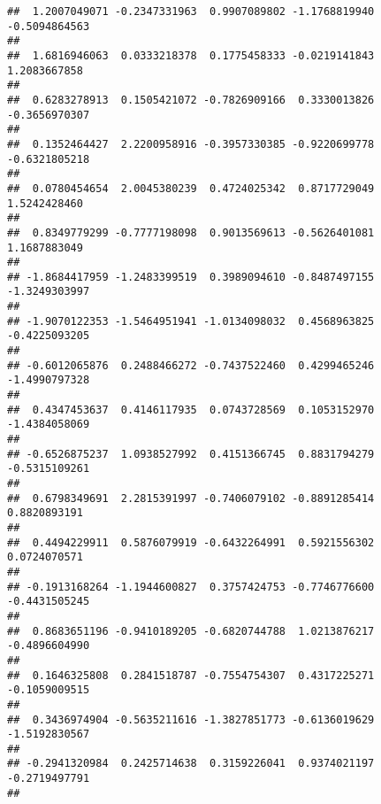 \documentclass[]{article}
\begin{document}
\begin{verbatim}
##  1.2007049071 -0.2347331963  0.9907089802 -1.1768819940 -0.5094864563 
##                                                                       
##  1.6816946063  0.0333218378  0.1775458333 -0.0219141843  1.2083667858 
##                                                                       
##  0.6283278913  0.1505421072 -0.7826909166  0.3330013826 -0.3656970307 
##                                                                       
##  0.1352464427  2.2200958916 -0.3957330385 -0.9220699778 -0.6321805218 
##                                                                       
##  0.0780454654  2.0045380239  0.4724025342  0.8717729049  1.5242428460 
##                                                                       
##  0.8349779299 -0.7777198098  0.9013569613 -0.5626401081  1.1687883049 
##                                                                       
## -1.8684417959 -1.2483399519  0.3989094610 -0.8487497155 -1.3249303997 
##                                                                       
## -1.9070122353 -1.5464951941 -1.0134098032  0.4568963825 -0.4225093205 
##                                                                       
## -0.6012065876  0.2488466272 -0.7437522460  0.4299465246 -1.4990797328 
##                                                                       
##  0.4347453637  0.4146117935  0.0743728569  0.1053152970 -1.4384058069 
##                                                                       
## -0.6526875237  1.0938527992  0.4151366745  0.8831794279 -0.5315109261 
##                                                                       
##  0.6798349691  2.2815391997 -0.7406079102 -0.8891285414  0.8820893191 
##                                                                       
##  0.4494229911  0.5876079919 -0.6432264991  0.5921556302  0.0724070571 
##                                                                       
## -0.1913168264 -1.1944600827  0.3757424753 -0.7746776600 -0.4431505245 
##                                                                       
##  0.8683651196 -0.9410189205 -0.6820744788  1.0213876217 -0.4896604990 
##                                                                       
##  0.1646325808  0.2841518787 -0.7554754307  0.4317225271 -0.1059009515 
##                                                                       
##  0.3436974904 -0.5635211616 -1.3827851773 -0.6136019629 -1.5192830567 
##                                                                       
## -0.2941320984  0.2425714638  0.3159226041  0.9374021197 -0.2719497791 
##                                                                       

\end{verbatim}
\end{document}
